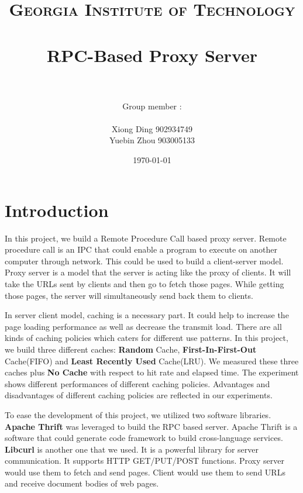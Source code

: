 \documentclass[paper=a4, fontsize=11pt]{scrartcl} %
\title{	
\normalfont \normalsize 
\textsc{Georgia Institute of Technology } \\ [25pt] %
\horrule{0.5pt} \\[0.4cm] %
\huge RPC-Based Proxy Server \\ %
\horrule{2pt} \\[0.5cm] %
}
\author{Group member : \\
\\
 Xiong Ding 902934749 \\ 
 Yuebin Zhou 903005133
} %
\date{\normalsize\today} %
\numberwithin{equation}{section} %
\numberwithin{figure}{section} %
\numberwithin{table}{section} %
\begin{document}
\maketitle %


\section{Introduction}

In this project, we build a Remote Procedure Call based proxy server. Remote procedure call is an IPC that could enable a program to execute on another computer through network. This could be used to build a client-server model. Proxy server is a model that the server is acting like the proxy of clients. It will take the URLs sent by clients and then go to fetch those pages. While getting those pages, the server will simultaneously send back them to clients. 

\vspace{1em}

In server client model, caching is a necessary part. It could help to increase the page loading performance as well as decrease the transmit load. There are all kinds of caching policies which caters for different use patterns. In this project, we build three different caches: 
\textbf{Random} Cache, \textbf{First-In-First-Out} Cache(FIFO) and
\textbf{Least Recently Used} Cache(LRU). We measured these three caches plus \textbf{No Cache} with respect to hit rate and elapsed time. The experiment shows different performances of different caching policies. Advantages and disadvantages of different caching policies are reflected in our experiments.

\vspace{1em}

To ease the development of this project, we utilized two software libraries. \textbf{Apache Thrift} was leveraged to build the RPC based server. Apache Thrift is a software that could generate code framework to build cross-language services. 
\textbf{Libcurl} is another one that we used. It is a powerful library for server communication. It supports HTTP GET/PUT/POST functions. Proxy server would use them to fetch and send pages. Client would use them to send URLs and receive document bodies of web pages. 
\end{document}
